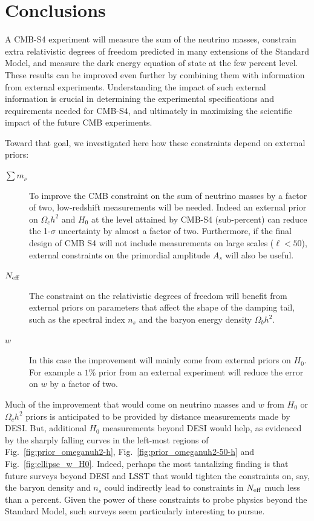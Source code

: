 \documentclass[aps,prd,reprint,superscriptaddress,nofootinbib]{revtex4-1}
\newcommand{\reffig}[1]{Fig.~\ref{fig:#1}}
\begin{document}
\section{Conclusions \label{sec:conclusions}}
A CMB-S4 experiment will measure the sum of the neutrino masses, constrain extra relativistic degrees of freedom predicted in many extensions of the Standard Model, and measure the dark energy equation of state at the few percent level. 
These results can be improved even further by combining them with information from external experiments.
Understanding the impact of such external information is crucial in determining the experimental specifications and requirements needed for CMB-S4, and ultimately in maximizing the scientific impact of the future CMB experiments. 

Toward that goal, we investigated here how these constraints depend on external priors:
\begin{description}
\item[$\sum m_\nu$] To improve the CMB constraint on the sum of neutrino masses by a factor of two, low-redshift measurements will be needed. Indeed an external prior on $\Omega_{c}h^{2}$ and $H_{0}$ at the level attained by CMB-S4 (sub-percent) can reduce the 1-$\sigma$ uncertainty by almost a factor of two.
Furthermore, if the final design of CMB S4 will not include measurements on large scales ($\ell<50$), external constraints on the primordial amplitude $A_{s}$ will also be useful. 
\item[$N_{\rm eff}$] The constraint on the relativistic degrees of freedom will benefit from external priors on parameters that affect the shape of the damping tail, such as the spectral index $n_s$ and the baryon energy density $\Omega_b h^2$.
\item[$w$] In this case the improvement will mainly come from external priors on $H_{0}$. For example a $1\%$ prior from an external experiment will reduce the error on $w$ by a factor of two.\end{description}

Much of the improvement that would come on neutrino masses and $w$ from $H_0$ or $\Omega_ch^2$ priors is anticipated to be provided by distance measurements made by DESI. But, additional $H_0$ measurements beyond DESI would help, as evidenced by the sharply falling curves in the left-most regions of \reffig{prior_omeganuh2-h}, \reffig{prior_omeganuh2-50-h} and \reffig{ellipse_w_H0}. Indeed, perhaps the most tantalizing finding is that future surveys beyond DESI and LSST \cite{lsst-dark-energy-science-collaboration:2012} that would tighten the constraints on, say, the baryon density and $n_s$ could indirectly lead to constraints in $N_{\rm eff}$ much less than a percent. Given the power of these constraints to probe physics beyond the Standard Model, such surveys seem particularly interesting to pursue.
\end{document}

